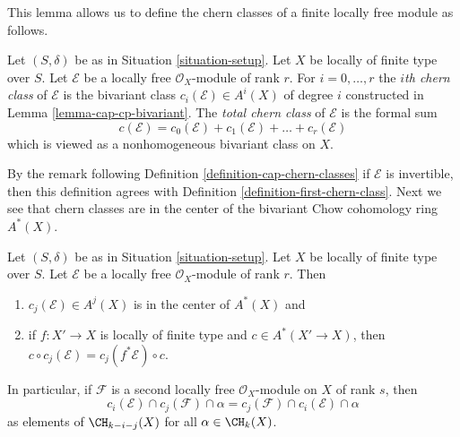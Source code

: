 \noindent
This lemma allows us to define the chern classes of a finite
locally free module as follows.

\begin{definition}
\label{definition-chern-classes-final}
Let $(S, \delta)$ be as in Situation \ref{situation-setup}.
Let $X$ be locally of finite type over $S$.
Let $\mathcal{E}$ be a locally free $\mathcal{O}_X$-module
of rank $r$. For $i = 0, \ldots, r$ the {\it $i$th chern class}
of $\mathcal{E}$ is the bivariant class
$c_i(\mathcal{E}) \in A^i(X)$ of degree $i$
constructed in Lemma \ref{lemma-cap-cp-bivariant}. The
{\it total chern class} of $\mathcal{E}$ is the formal sum
$$
c(\mathcal{E}) = 
c_0(\mathcal{E}) + c_1(\mathcal{E}) + \ldots + c_r(\mathcal{E})
$$
which is viewed as a nonhomogeneous bivariant class on $X$.
\end{definition}

\noindent
By the remark following Definition \ref{definition-cap-chern-classes}
if $\mathcal{E}$ is invertible, then this definition agrees with
Definition \ref{definition-first-chern-class}.
Next we see that chern classes are in the center of the bivariant
Chow cohomology ring $A^*(X)$.

\begin{lemma}
\label{lemma-cap-commutative-chern}
Let $(S, \delta)$ be as in Situation \ref{situation-setup}.
Let $X$ be locally of finite type over $S$.
Let $\mathcal{E}$ be a locally free $\mathcal{O}_X$-module of rank $r$.
Then
\begin{enumerate}
\item $c_j(\mathcal{E}) \in A^j(X)$ is in the center of $A^*(X)$ and
\item if $f : X' \to X$ is locally of finite type and $c \in A^*(X' \to X)$,
then $c \circ c_j(\mathcal{E}) = c_j(f^*\mathcal{E}) \circ c$.
\end{enumerate}
In particular, if $\mathcal{F}$ is a second locally free
$\mathcal{O}_X$-module on $X$ of rank $s$, then
$$
c_i(\mathcal{E}) \cap c_j(\mathcal{F}) \cap \alpha
=
c_j(\mathcal{F}) \cap c_i(\mathcal{E}) \cap \alpha
$$
as elements of $\CH_{k - i - j}(X)$ for all $\alpha \in \CH_k(X)$.
\end{lemma}

